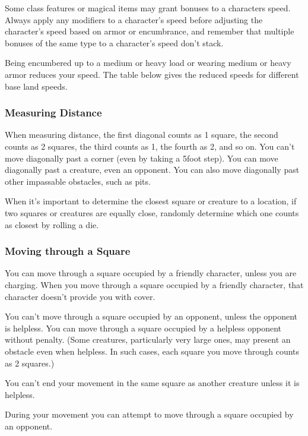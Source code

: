 Some class features or magical items may grant bonuses to a characters speed. Always apply any modifiers to a character's speed before adjusting the character's speed based on armor or encumbrance, and remember that multiple bonuses of the same type to a character's speed don't stack.

Being encumbered up to a medium or heavy load or wearing medium or heavy armor reduces your speed.  The table below gives the reduced speeds for different base land speeds.


\subsubsection{Measuring Distance}

When measuring distance, the first diagonal counts as 1 square, the second counts as 2 squares, the third counts as 1, the fourth as 2, and so on. You can't move diagonally past a corner (even by taking a 5\textendash foot step). You can move diagonally past a creature, even an opponent. You can also move diagonally past other impassable obstacles, such as pits.

When it's important to determine the closest square or creature to a location, if two squares or creatures are equally close, randomly determine which one counts as closest by rolling a die.

\subsubsection{Moving through a Square}

You can move through a square occupied by a friendly character, unless you are charging. When you move through a square occupied by a friendly character, that character doesn't provide you with cover.

You can't move through a square occupied by an opponent, unless the opponent is helpless. You can move through a square occupied by a helpless opponent without penalty. (Some creatures, particularly very large ones, may present an obstacle even when helpless. In such cases, each square you move through counts as 2 squares.)

You can't end your movement in the same square as another creature unless it is helpless.

During your movement you can attempt to move through a square occupied by an opponent.

